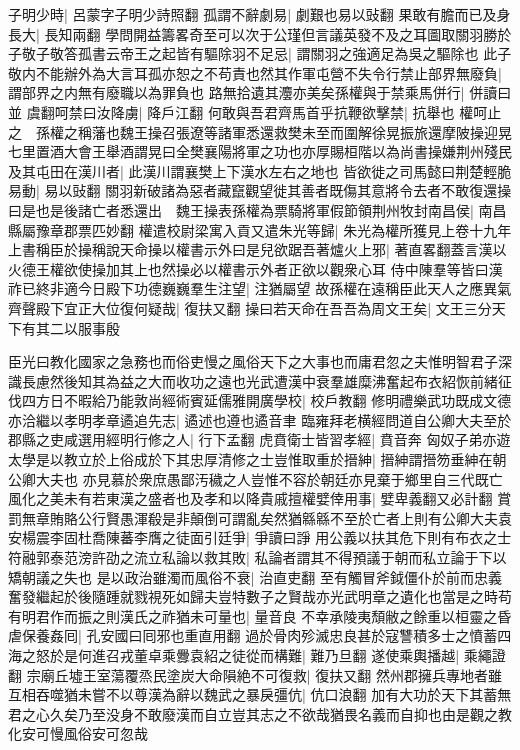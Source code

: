 子明少時|{
	呂蒙字子明少詩照翻}
孤謂不辭劇易|{
	劇艱也易以䜴翻}
果敢有膽而已及身長大|{
	長知兩翻}
學問開益籌畧奇至可以次于公瑾但言議英發不及之耳圖取關羽勝於子敬子敬答孤書云帝王之起皆有驅除羽不足忌|{
	謂關羽之強適足為吳之驅除也}
此子敬内不能辦外為大言耳孤亦恕之不苟責也然其作軍屯營不失令行禁止部界無廢負|{
	謂部界之内無有廢職以為罪負也}
路無拾遺其灋亦美矣孫權與于禁乘馬併行|{
	併讀曰並}
虞翻呵禁曰汝降虜|{
	降戶江翻}
何敢與吾君齊馬首乎抗鞭欲擊禁|{
	抗舉也}
權呵止之　孫權之稱藩也魏王操召張遼等諸軍悉還救樊未至而圍解徐晃振旅還摩陂操迎晃七里置酒大會王舉酒謂晃曰全樊襄陽將軍之功也亦厚賜桓階以為尚書操嫌荆州殘民及其屯田在漢川者|{
	此漢川謂襄樊上下漢水左右之地也}
皆欲徙之司馬懿曰荆楚輕脆易動|{
	易以䜴翻}
關羽新破諸為惡者藏竄觀望徙其善者既傷其意將令去者不敢復還操曰是也是後諸亡者悉還出　魏王操表孫權為票騎將軍假節領荆州牧封南昌侯|{
	南昌縣屬豫章郡票匹妙翻}
權遣校尉梁寓入貢又遣朱光等歸|{
	朱光為權所獲見上卷十九年}
上書稱臣於操稱說天命操以權書示外曰是兒欲踞吾著爐火上邪|{
	著直畧翻蓋言漢以火德王權欲使操加其上也然操必以權書示外者正欲以觀衆心耳}
侍中陳羣等皆曰漢祚已終非適今日殿下功德巍巍羣生注望|{
	注猶屬望}
故孫權在遠稱臣此天人之應異氣齊聲殿下宜正大位復何疑哉|{
	復扶又翻}
操曰若天命在吾吾為周文王矣|{
	文王三分天下有其二以服事殷}


臣光曰教化國家之急務也而俗吏慢之風俗天下之大事也而庸君忽之夫惟明智君子深識長慮然後知其為益之大而收功之遠也光武遭漢中衰羣雄糜沸奮起布衣紹恢前緒征伐四方日不暇給乃能敦尚經術賓延儒雅開廣學校|{
	校戶教翻}
修明禮樂武功既成文德亦洽繼以孝明孝章遹追先志|{
	遹述也遵也遹音聿}
臨雍拜老横經問道自公卿大夫至於郡縣之吏咸選用經明行修之人|{
	行下孟翻}
虎賁衛士皆習孝經|{
	賁音奔}
匈奴子弟亦遊太學是以教立於上俗成於下其忠厚清修之士豈惟取重於搢紳|{
	搢紳謂搢笏垂紳在朝公卿大夫也}
亦見慕於衆庶愚鄙汚穢之人豈惟不容於朝廷亦見棄于鄉里自三代既亡風化之美未有若東漢之盛者也及孝和以降貴戚擅權嬖倖用事|{
	嬖卑義翻又必計翻}
賞罰無章賄賂公行賢愚渾殽是非顛倒可謂亂矣然猶緜緜不至於亡者上則有公卿大夫袁安楊震李固杜喬陳蕃李膺之徒面引廷爭|{
	爭讀曰諍}
用公義以扶其危下則有布衣之士符融郭泰范滂許劭之流立私論以救其敗|{
	私論者謂其不得預議于朝而私立論于下以矯朝議之失也}
是以政治雖濁而風俗不衰|{
	治直吏翻}
至有觸冒斧鉞僵仆於前而忠義奮發繼起於後隨踵就戮視死如歸夫豈特數子之賢哉亦光武明章之遺化也當是之時苟有明君作而振之則漢氏之祚猶未可量也|{
	量音良}
不幸承陵夷頹敝之餘重以桓靈之昏虐保養姦囘|{
	孔安國曰囘邪也重直用翻}
過於骨肉殄滅忠良甚於寇讐積多士之憤蓄四海之怒於是何進召戎董卓乘釁袁紹之徒從而構難|{
	難乃旦翻}
遂使乘輿播越|{
	乘繩證翻}
宗廟丘墟王室蕩覆烝民塗炭大命隕絶不可復救|{
	復扶又翻}
然州郡擁兵專地者雖互相吞噬猶未嘗不以尊漢為辭以魏武之暴戾彊伉|{
	伉口浪翻}
加有大功於天下其蓄無君之心久矣乃至没身不敢廢漢而自立豈其志之不欲哉猶畏名義而自抑也由是觀之教化安可慢風俗安可忽哉

